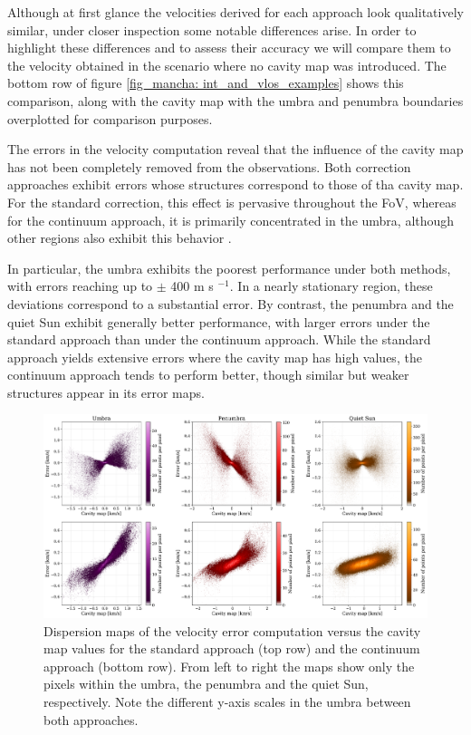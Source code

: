 Although at first glance the velocities derived for each approach look qualitatively similar, under closer inspection some notable differences arise. In order to highlight these differences and to assess their accuracy we will compare them to the velocity obtained in the scenario where no cavity map was introduced. The bottom row of figure \ref{fig_mancha: int_and_vlos_examples} shows this comparison, along with the cavity map with the umbra and penumbra boundaries overplotted for comparison purposes.

The errors in the velocity computation reveal that the influence of the cavity map has not been completely removed from the observations. Both correction approaches exhibit errors whose structures correspond to those of tha cavity map. For the standard correction, this effect is pervasive throughout the FoV, whereas for the continuum approach, it is primarily concentrated in the umbra, although other regions also exhibit this behavior .

In particular, the umbra exhibits the poorest performance under both methods, with errors reaching up to $\pm$ 400 m s $^{-1}$. In a nearly stationary region, these deviations correspond to a substantial error. By contrast, the penumbra and the quiet Sun exhibit generally better performance, with larger errors under the standard approach than under the continuum approach. While the standard approach yields extensive errors where the cavity map has high values, the continuum approach tends to perform better, though similar but weaker structures appear in its error maps.

\begin{figure}[t]
  \includegraphics[width=\textwidth]{figures/Mancha/dispersion_maps.pdf}
  \caption[Velocity errors dispersion maps.]{
  Dispersion maps of the velocity error computation versus the cavity map values for the standard approach (top row) and the continuum approach (bottom row). From left to right the maps show only the pixels within the umbra, the penumbra and the quiet Sun, respectively. Note the different y-axis scales in the umbra between both approaches. \label{fig_mancha: dispersion_maps}}
\end{figure}

